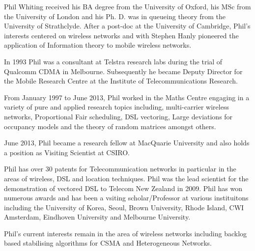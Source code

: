 Phil Whiting received his BA degree from the University of Oxford, his
MSc from the University of London and his Ph. D. was in queueing
theory from the University of Strathclyde. After a post-doc at the
University of Cambridge, Phil's interests centered on wireless networks and
with Stephen Hanly pioneered the application of Information theory
to mobile wireless networks.

In 1993 Phil was a consultant at Telstra research labs during the trial of Qualcomm
CDMA in Melbourne. Subsequently he became Deputy Director for the Mobile Research Centre at the
Institute of Telecommunications Research.

From January 1997 to June 2013, Phil worked in the Maths Centre engaging in a variety of pure
and applied research topics including, multi-carrier wireless networks, Proportional Fair scheduling,
DSL vectoring, Large deviations for occupancy models and the theory of random matrices amongst others.

June 2013, Phil became a research fellow at MacQuarie University and also holds a position
as Visiting Scientist at CSIRO.


Phil has over 30 patents for Telecommunication networks in particular in
the areas of wireless, DSL and location techniques.  Phil was the lead scientist for the demonstration of
vectored DSL to Telecom New Zealand in 2009. Phil has won numerous awards and has been a vsiting scholar/Professor at various instituitons including the University of Korea, Seoul, Brown University, Rhode Island, CWI Amsterdam, Eindhoven University and Melbourne University.

Phil's current interests remain in the area of wireless networks including backlog based stabilising algorithms for CSMA and Heterogeneous Networks.
